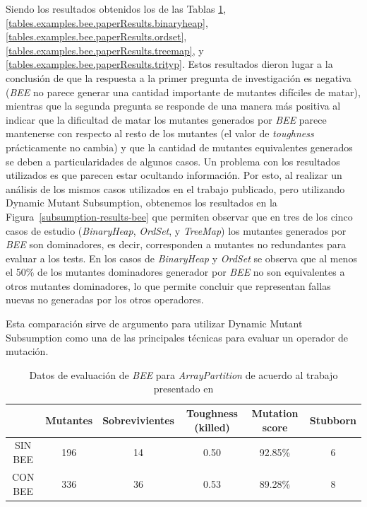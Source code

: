 Siendo los resultados obtenidos los de las Tablas \ref{tables.examples.bee.paperResults.arraypartition}, \ref{tables.examples.bee.paperResults.binaryheap}, \ref{tables.examples.bee.paperResults.ordset}, \ref{tables.examples.bee.paperResults.treemap}, y \ref{tables.examples.bee.paperResults.trityp}. Estos resultados dieron lugar a la conclusi\'on de que la respuesta a la primer pregunta de investigaci\'on es negativa (\emph{BEE} no parece generar una cantidad importante de mutantes dif\'iciles de matar), mientras que la segunda pregunta se responde de una manera m\'as positiva al indicar que la dificultad de matar los mutantes generados por \emph{BEE} parece mantenerse con respecto al resto de los mutantes (el valor de \emph{toughness} pr\'acticamente no cambia) y que la cantidad de mutantes equivalentes generados se deben a particularidades de algunos casos. Un problema con los resultados utilizados es que parecen estar ocultando informaci\'on. Por esto, al realizar un an\'alisis de los mismos casos utilizados en el trabajo publicado, pero utilizando Dynamic Mutant Subsumption, obtenemos los resultados en la Figura~\ref{subsumption-results-bee} que permiten observar que en tres de los cinco casos de estudio (\emph{BinaryHeap}, \emph{OrdSet}, y \emph{TreeMap}) los mutantes generados por \emph{BEE} son dominadores, es decir, corresponden a mutantes no redundantes para evaluar a los tests. En los casos de \emph{BinaryHeap} y \emph{OrdSet} se observa que al menos el 50\% de los mutantes dominadores generador por \emph{BEE} no son equivalentes a otros mutantes dominadores, lo que permite concluir que representan fallas nuevas no generadas por los otros operadores.

Esta comparaci\'on sirve de argumento para utilizar Dynamic Mutant Subsumption como una de las principales t\'ecnicas para evaluar un operador de mutaci\'on.

\begin{table}[]
	\caption[Resultados de la evaluaci\'on de \emph{BEE} para \emph{ArrayPartition}]{Datos de evaluaci\'on de \emph{BEE} para \emph{ArrayPartition} de acuerdo al trabajo presentado en \cite{bibliography.mutation.operators.beeBridaS17}}
	\label{tables.examples.bee.paperResults.arraypartition}
	\centering
	\scriptsize
	\def\arraystretch{0.95}
	\setlength\tabcolsep{0.5mm}
	\begin{tabular}{c|ccccc|}
		\cline{2-6}
		& Mutantes & Sobrevivientes & Toughness (killed) & Mutation score & Stubborn \\ \hline
		\multicolumn{1}{|c|}{SIN BEE} & 196 & 14 & 0.50 & 92.85\% & 6 \\ \hline
		\multicolumn{1}{|c|}{CON BEE} & 336 & 36 & 0.53 & 89.28\% & 8 \\ \hline
	\end{tabular}
\end{table}

